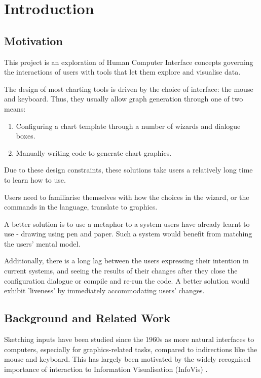 \chapter{Introduction}
\section{Motivation}
This project is an exploration of Human Computer Interface concepts governing the interactions of users with tools that let them explore and visualise data.

The design of most charting tools is driven by the choice of interface: the mouse and keyboard. Thus, they usually allow graph generation through one of two means:
\begin{enumerate}
\item Configuring a chart template through a number of wizards and dialogue boxes.
\item Manually writing code to generate chart graphics.
\end{enumerate}

Due to these design constraints, these solutions take users a relatively long time to learn how to use. 

Users need to familiarise themselves with how the choices in the wizard, or the commands in the language, translate to graphics.

A better solution is to use a metaphor to a system users have already learnt to use - drawing using pen and paper. Such a system would benefit from matching the users' mental model. 

Additionally, there is a long lag between the users expressing their intention in current systems, and seeing the results of their changes after they close the configuration dialogue or compile and re-run the code. A better solution would exhibit 'liveness' by immediately accommodating users' changes.

\section{Background and Related Work}
Sketching inputs have been studied since the 1960s \citep{sutherland_sketch_1964} as more natural interfaces to computers, especially for graphics-related tasks, compared to indirections like the mouse and keyboard. This has largely been motivated by the widely recognised importance of interaction to Information Visualisation (InfoVis) \citep{lee_beyond_2012}. 

